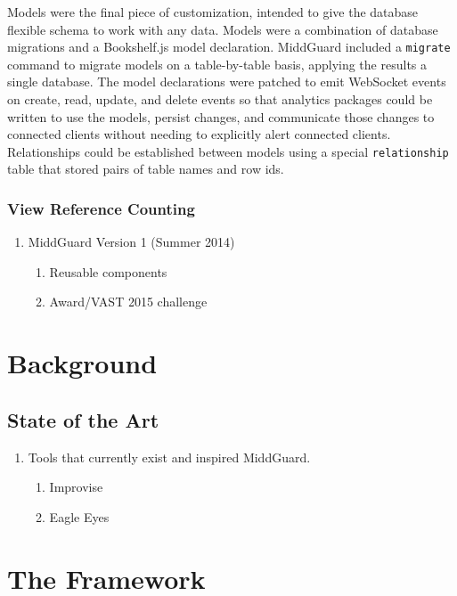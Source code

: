 \documentclass[midd]{thesis}
\begin{document}
Models were the final piece of customization, intended to give the database
flexible schema to work with any data. Models were a combination of database
migrations and a Bookshelf.js \cite{bookshelf} model declaration. MiddGuard
included a \texttt{migrate} command to migrate models on a table-by-table basis,
applying the results a single database. The model declarations were patched to
emit WebSocket events on create, read, update, and delete events so that
analytics packages could be written to use the models, persist changes, and
communicate those changes to connected clients without needing to explicitly
alert connected clients. Relationships could be established between models using
a special \texttt{relationship} table that stored pairs of table names and row
ids.

\subsection{View Reference Counting}

\begin{enumerate}
  \item MiddGuard Version 1 (Summer 2014)
  \begin{enumerate}
    \item Reusable components
    \item Award/VAST 2015 challenge
  \end{enumerate}
\end{enumerate}


\chapter{Background}

\section{State of the Art}
  \begin{enumerate}
    \item Tools that currently exist and inspired MiddGuard.
    \begin{enumerate}
      \item Improvise
      \item Eagle Eyes
    \end{enumerate}
  \end{enumerate}

\chapter{The Framework}
\end{document}
